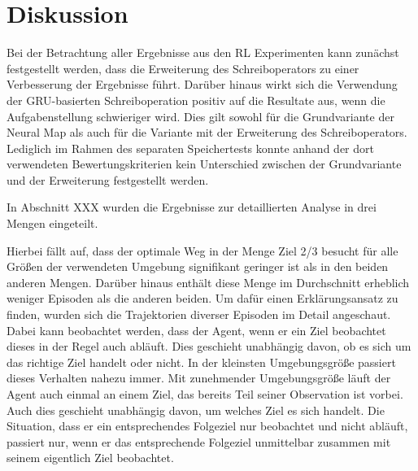 \chapter{Diskussion}
\label{chap_disc}


Bei der Betrachtung aller Ergebnisse aus den RL Experimenten kann zunächst festgestellt werden, dass die Erweiterung des Schreiboperators zu einer Verbesserung der Ergebnisse führt. Darüber hinaus wirkt sich die Verwendung der GRU-basierten Schreiboperation positiv auf die Resultate aus, wenn die Aufgabenstellung schwieriger wird. Dies gilt sowohl für die Grundvariante der Neural Map als auch für die Variante mit der Erweiterung des Schreiboperators. Lediglich im Rahmen des separaten Speichertests konnte anhand der dort verwendeten Bewertungskriterien kein Unterschied zwischen der Grundvariante und der Erweiterung festgestellt werden.

In Abschnitt XXX wurden die Ergebnisse zur detaillierten Analyse in drei Mengen eingeteilt.

Hierbei fällt auf, dass der optimale Weg in der Menge \glqq Ziel 2/3 besucht\grqq{} für alle Größen der verwendeten Umgebung signifikant geringer ist als in den beiden anderen Mengen. Darüber hinaus enthält diese Menge im Durchschnitt erheblich weniger Episoden als die anderen beiden. Um dafür einen Erklärungsansatz zu finden, wurden sich die Trajektorien diverser Episoden im Detail angeschaut. Dabei kann beobachtet werden, dass der Agent, wenn er ein Ziel beobachtet dieses in der Regel auch abläuft. Dies geschieht unabhängig davon, ob es sich um das richtige Ziel handelt oder nicht. In der kleinsten Umgebungsgröße passiert dieses Verhalten nahezu immer. Mit zunehmender Umgebungsgröße läuft der Agent auch einmal an einem Ziel, das bereits Teil seiner Observation ist vorbei. Auch dies geschieht unabhängig davon, um welches Ziel es sich handelt. Die Situation, dass er ein entsprechendes Folgeziel nur beobachtet und nicht abläuft, passiert nur, wenn er das entsprechende Folgeziel unmittelbar zusammen mit seinem eigentlich Ziel beobachtet.




